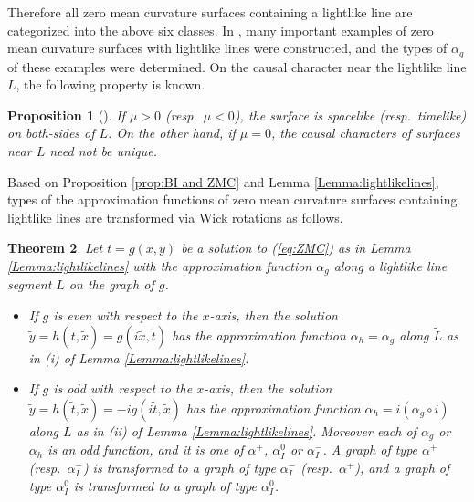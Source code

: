 \documentclass[12pt,amstex]{amsart}%
\theoremstyle{plain} %
\newtheorem{theorem}{Theorem}[section]
\newtheorem{proposition}[theorem]{Proposition}
\theoremstyle{definition}
\begin{document}
Therefore all zero mean curvature surfaces containing a lightlike line are categorized into the above six classes. In \cite{A1,FujimoriETAL1,FujimoriETAL2,FujimoriETAL3}, many important examples of zero mean curvature surfaces with lightlike lines were constructed, and the types of $\alpha_g$ of these examples were determined. On the causal character near the lightlike line $L$, the following property is known.
\begin{proposition}[\cite{FujimoriETAL1}]\label{Prop:FujimoriETAL1}
If $\mu>0$ (resp.\ $\mu<0$), the surface is spacelike (resp.\ timelike) on both-sides of $L$. On the other hand, if $\mu=0$, the causal characters of surfaces near $L$ need not be unique.
\end{proposition}

Based on Proposition \ref{prop:BI and ZMC} and Lemma \ref{Lemma:lightlikelines}, types of the approximation functions of zero mean curvature surfaces containing lightlike lines are transformed via Wick rotations as follows.

\begin{theorem}\label{thm:transformations of L-line}
Let $t=g(x,y)$ be a solution to (\ref{eq:ZMC}) as in Lemma \ref{Lemma:lightlikelines} with the approximation function $\alpha_g$ along a lightlike line segment $L$ on the graph of $g$.
\begin{itemize}
\item[(i)] If $g$ is even with respect to the $x$-axis, then the solution $\tilde{y}=h(\tilde{t},\tilde{x})=g(i\tilde{x},\tilde{t})$ 
has the approximation function $\alpha_h=\alpha_g$ along $\tilde{L}$ as in (i) of Lemma \ref{Lemma:lightlikelines}.
\item[(ii)] If $g$ is odd with respect to the $x$-axis, then the solution $\tilde{y}=h(\tilde{t},\tilde{x})=-ig(i\tilde{t},\tilde{x})$ has the approximation function $\alpha_h=i(\alpha_g\circ i)$ along $\tilde{L}$ as in (ii) of Lemma \ref{Lemma:lightlikelines}. Moreover each of $\alpha_g$ or $\alpha_h$ is an odd function, and it is one of $\alpha^+$, $\alpha^0_{I}$ or $\alpha^-_{I}$. A graph of type $\alpha^+$ (resp.\ $\alpha^-_{I}$) is transformed to a graph of type $\alpha^-_{I}$ (resp.\ $\alpha^+$), and a graph of type $\alpha^0_{I}$ is transformed to a graph of type $\alpha^0_{I}$.
\end{itemize}
\end{theorem}
\end{document}
